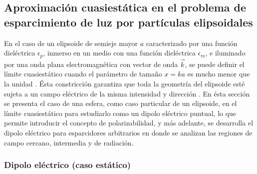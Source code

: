 \hypertarget{primera}{\subsection{Aproximación cuasiestática en el problema de esparcimiento de luz por partículas elipsoidales}}

 En el caso de un elipsoide de semieje mayor $a$ caracterizado por una función dieléctrica $\epsilon_p$, inmerso en un medio con una función dieléctrica $\epsilon_m$, e iluminado por una onda plana electromagnética con vector de onda $\Vec{k}$, se puede definir el límite cuasiestático cuando el parámetro de tamaño $x=ka$ es mucho menor que la unidad \cite{Bohren}. Ésta constricción garantiza que toda la geometría del elipsoide esté sujeta a un campo eléctrico de la misma intensidad y dirección \cite{Cuasiestatico}. En ésta sección se presenta el caso de una esfera, como caso particular de un elipsoide, en el límite cuasiestático para estudiarlo como un dipolo eléctrico puntual, lo que permite introducir el concepto de polarizabilidad, y más adelante, se desarrolla el dipolo eléctrico para esparcidores arbitrarios en donde se analizan las regiones de campo cercano, intermedia y de radiación.


\subsubsection{Dipolo eléctrico (caso estático)}

